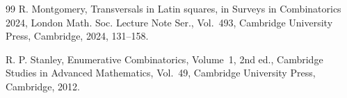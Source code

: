 \documentclass[10pt,a4paper]{article}
\numberwithin{equation}{section}
\theoremstyle{definition}
\begin{document}
\begin{thebibliography}{99}
        R. Montgomery,
        Transversals in Latin squares,
        in Surveys in Combinatorics 2024, London Math. Soc. Lecture Note Ser., Vol.~493,
        Cambridge University Press, Cambridge, 2024, 131--158.

        R. P. Stanley,
        Enumerative Combinatorics, Volume~1,
        2nd ed., Cambridge Studies in Advanced Mathematics, Vol.~49,
        Cambridge University Press, Cambridge, 2012.


\end{thebibliography}
\end{document}

